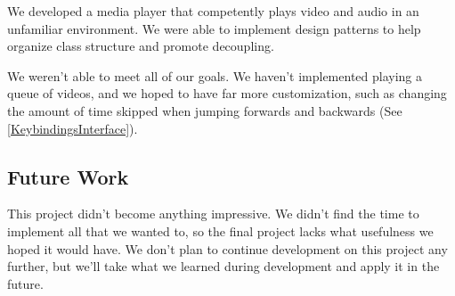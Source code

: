 \documentclass[10pt,conference,onecolumn,compsoc]{IEEEtran}
\begin{document}
We developed a media player that competently plays video and audio in an unfamiliar environment. We were able to implement design patterns to help organize class structure and promote decoupling. \medskip

We weren't able to meet all of our goals. We haven't implemented playing a queue of videos, and we hoped to have far more customization, such as changing the amount of time skipped when jumping forwards and backwards (See \ref{KeybindingsInterface}).

\subsection{Future Work}
This project didn't become anything impressive. We didn't find the time to implement all that we wanted to, so the final project lacks what usefulness we hoped it would have. We don't plan to continue development on this project any further, but we'll take what we learned during development and apply it in the future. 

















\end{document}
